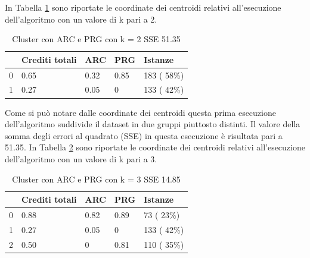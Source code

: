\documentclass[12pt]{article}
\begin{document}
In Tabella \ref{c2AP} sono riporta\-te le coordinate dei centroidi relativi all'esecuzione dell'algoritmo con un valore di k pari a 2.
\begin{table}[ht]
	\centering
	\begin{tabular}{@{}lllll@{}}
	\toprule
	  & Crediti totali & ARC  & PRG  & Istanze\\ \midrule
	0 & 0.65           & 0.32 & 0.85 & 183 ( 58\%)\\
	1 & 0.27           & 0.05 & 0    & 133 ( 42\%)\\ \bottomrule
	\end{tabular}
	\caption{Cluster con ARC e PRG con k = 2 SSE 51.35}
	\label{c2AP}
\end{table}
Come si può notare dalle coordinate dei centroidi questa prima esecuzione dell'algoritmo suddivide il dataset in due gruppi piuttosto distinti.
Il valore della somma degli errori al quadrato (SSE) in questa esecuzione è risultata pari a 51.35.
In Tabella \ref{c3AP} sono riportate le coordinate dei centroidi relativi all'esecuzione dell'algoritmo con un valore di k pari a 3.
\begin{table}[ht]
	\centering
	\begin{tabular}{@{}lllll@{}}
	\toprule
	  & Crediti totali & ARC  & PRG  & Istanze\\ \midrule
	0 & 0.88           & 0.82 & 0.89 & 73 ( 23\%)\\
	1 & 0.27           & 0.05 & 0    & 133 ( 42\%)\\
	2 & 0.50           & 0    & 0.81 & 110 ( 35\%)\\ \bottomrule
	\end{tabular}
	\caption{Cluster con ARC e PRG con k = 3 SSE 14.85}
	\label{c3AP}
\end{table}
\end{document}
